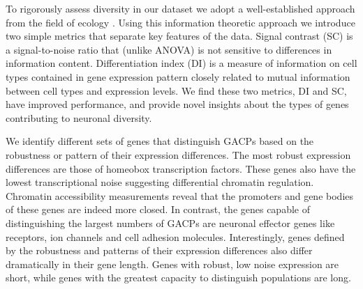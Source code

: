 To rigorously assess diversity in our dataset we adopt a well-established approach from the field of ecology \citep{Simpson_1949}. Using this information theoretic approach we introduce two simple metrics that separate key features of the data. Signal contrast (SC) is a signal-to-noise ratio that (unlike ANOVA) is not sensitive to differences in information content. Differentiation index (DI) is a measure of information on cell types contained in gene expression pattern closely related to mutual information between cell types and expression levels. We find these two metrics, DI and SC, have improved performance, and provide novel insights about the types of genes contributing to neuronal diversity.

We identify different sets of genes that distinguish GACPs based on the robustness or pattern of their expression differences. The most robust expression differences are those of homeobox transcription factors. These genes also have the lowest transcriptional noise suggesting differential chromatin regulation. Chromatin accessibility measurements reveal that the promoters and gene bodies of these genes are indeed more closed. In contrast, the genes capable of distinguishing the largest numbers of GACPs are neuronal effector genes like receptors, ion channels and cell adhesion molecules. Interestingly, genes defined by the robustness and patterns of their expression differences also differ dramatically in their gene length. Genes with robust, low noise expression are short, while genes with the greatest capacity to distinguish populations are long. %

